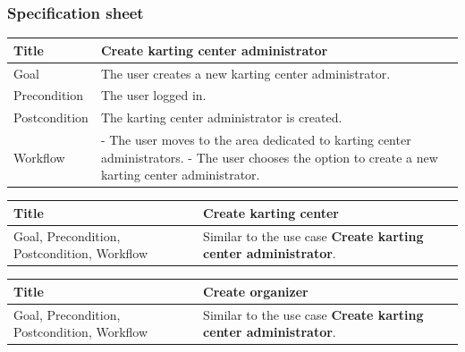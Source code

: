 \documentclass{beamer}
\begin{document}
\begin{frame}
    \frametitle{Specification sheet}
    \begin{table}
        \tiny
        \begin{tabular}{|p{2cm}|p{6cm}|}
        \hline  
        Title & \textbf{Create karting center administrator} \\
        \hline  
        Goal & The user creates a new karting center administrator. \\
        \hline
        Precondition & The user logged in. \\
        \hline
        Postcondition & The karting center administrator is created. \\
        \hline
        Workflow &
        - The user moves to the area dedicated to karting center administrators. \newline
        - The user chooses the option to create a new karting center administrator. \\
        \hline
        \end{tabular}
\end{table}

\begin{table}
    \tiny
    \begin{tabular}{|p{2cm}|p{6cm}|}
    \hline  
    Title & \textbf{Create karting center} \\
    \hline
    Goal, Precondition, Postcondition, Workflow & Similar 
    to the use case \textbf{Create karting center administrator}. \\
    \hline
    \end{tabular}
\end{table}

\begin{table}
    \tiny
    \begin{tabular}{|p{2cm}|p{6cm}|}
    \hline  
        Title & \textbf{Create organizer} \\
        \hline
        Goal, Precondition, Postcondition, Workflow & Similar 
        to the use case \textbf{Create karting center administrator}. \\
        \hline
        \end{tabular}
\end{table}

\end{frame}
\end{document}
